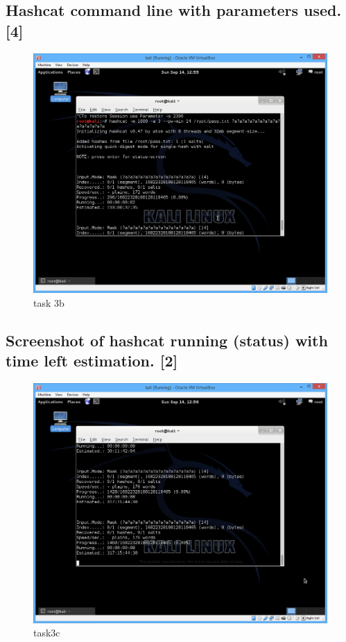 \documentclass[11pt,titlepage]{article}
\begin{document}
\subsection{Hashcat command line with parameters used. [4]}
\begin{figure}[H]
\begin{center}
\includegraphics[scale=0.6]{task3b.png}
\caption{task 3b}
\end{center}
\end{figure}

\subsection{Screenshot of hashcat running (status) with time left estimation. [2]}
\begin{figure}[H]
\begin{center}
\includegraphics[scale=0.6]{task3c.png}
\caption{task3c}
\end{center}
\end{figure}
\end{document}
